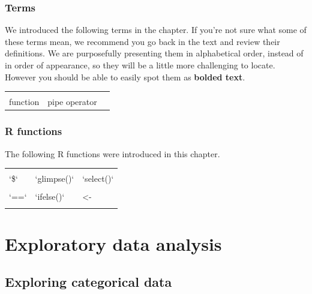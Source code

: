 \documentclass[
  10pt,
  openany]{book}
\theoremstyle{definition}
\theoremstyle{definition}
\theoremstyle{definition}
\theoremstyle{definition}
\theoremstyle{remark}
\begin{document}
\section*{Terms}\label{terms-2}

We introduced the following terms in the chapter.
If you're not sure what some of these terms mean, we recommend you go back in the text and review their definitions.
We are purposefully presenting them in alphabetical order, instead of in order of appearance, so they will be a little more challenging to locate.
However you should be able to easily spot them as \textbf{bolded text}.

\begin{tabu} to 
\toprule
{} &  & \\
function & pipe operator & \\
\bottomrule
\end{tabu}

\section*{R functions}\label{r-functions}

The following R functions were introduced in this chapter.

\begin{tabu} to 
\toprule
{} &  & \\
`\$` & `glimpse()` & `select()`\\
 &  & \\
`==` & `ifelse()` & <-\\
 &  & \\
\bottomrule
\end{tabu}

\part{Exploratory data analysis}\label{part-exploratory-data-analysis}

\chapter{Exploring categorical data}\label{explore-categorical}
\end{document}
